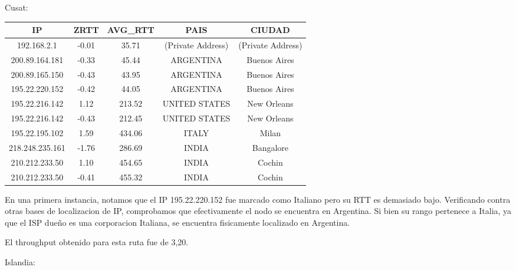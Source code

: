 \medskip

Cusat:

\begin{tabular}{|c@{\hspace{5ex}}c@{\hspace{5ex}}c@{\hspace{5ex}}c@{\hspace{5ex}}c|}
 \hline
 \rule{0pt}{1.2em}IP & ZRTT & AVG\_RTT & PAIS & CIUDAD\\[0.2em]
 \hline

\rule{0pt}{1.2em} 192.168.2.1  &  -0.01 & 35.71 & (Private Address) & (Private Address) \\[0.2em]
\rule{0pt}{1.2em} 200.89.164.181  &  -0.33 & 45.44 & ARGENTINA & Buenos Aires \\[0.2em]
\rule{0pt}{1.2em} 200.89.165.150  &  -0.43 & 43.95 & ARGENTINA & Buenos Aires \\[0.2em]
\rule{0pt}{1.2em} 195.22.220.152  &  -0.42 & 44.05 & ARGENTINA & Buenos Aires \\[0.2em]
\rule{0pt}{1.2em} 195.22.216.142  &  1.12 & 213.52 & UNITED STATES & New Orleans \\[0.2em]
\rule{0pt}{1.2em} 195.22.216.142  &  -0.43 & 212.45 & UNITED STATES & New Orleans \\[0.2em]
\rule{0pt}{1.2em} 195.22.195.102  &  1.59 & 434.06 & ITALY & Milan \\[0.2em]
\rule{0pt}{1.2em} 218.248.235.161  &  -1.76 & 286.69 & INDIA & Bangalore \\[0.2em]
\rule{0pt}{1.2em} 210.212.233.50  &  1.10 & 454.65 & INDIA & Cochin \\[0.2em]
\rule{0pt}{1.2em} 210.212.233.50  &  -0.41 & 455.32 & INDIA & Cochin \\[0.2em]
\hline
 \end{tabular}

 En una primera instancia, notamos que el IP 195.22.220.152 fue marcado como Italiano pero su RTT es demasiado bajo. Verificando contra otras bases de localizacion de IP, comprobamos que efectivamente el nodo se encuentra en Argentina. Si bien su rango pertenece a Italia, ya que el ISP dueño es una corporacion Italiana, se encuentra fisicamente localizado en Argentina.

El throughput obtenido para esta ruta fue de 3,20.

\medskip

Islandia:

